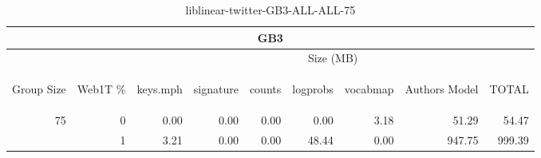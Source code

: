 \begin{center}
\begin{table}[htbp]
\begin{tabular}{ | r | r | r | r | r | r | r | r | r |}
\hline
\multicolumn{9}{|c|}{GB3}\\
\hline
 & & \multicolumn{7}{|c|}{Size (MB)}\\ \cline{3-9}
\begin{sideways}Group Size\end{sideways} & \begin{sideways}Web1T \% \end{sideways} & \begin{sideways}keys.mph\end{sideways} & \begin{sideways}signature\end{sideways} & \begin{sideways}counts\end{sideways} & \begin{sideways}logprobs\end{sideways} & \begin{sideways}vocabmap\end{sideways} & \begin{sideways}Authors Model \end{sideways} & \begin{sideways}TOTAL\end{sideways}\\
\hline
\multirow{1}{*}{75}
 & 0 & 0.00 & 0.00 & 0.00 & 0.00 & 3.18 & 51.29 & 54.47\\ \cline{2-9}
 & 1 & 3.21 & 0.00 & 0.00 & 48.44 & 0.00 & 947.75 & 999.39\\ \cline{2-9}
\hline
\end{tabular}
\caption{liblinear-twitter-GB3-ALL-ALL-75}
\label{table:liblinear-twitter-GB3-ALL-ALL-75}
\end{table}
\end{center}

